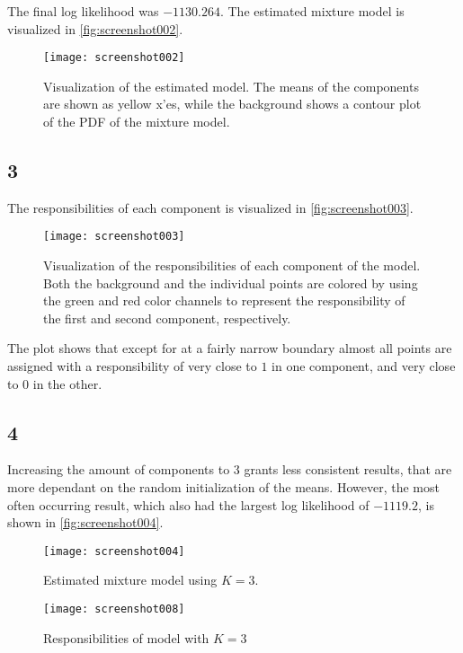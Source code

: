 \documentclass[a4paper, 12pt]{article}
\begin{document}
The final log likelihood was $-1130.264$. The estimated mixture model is visualized in \autoref{fig:screenshot002}.

\begin{figure}[H]
	\centering
	\texttt{[image: screenshot002]}
	\caption{Visualization of the estimated model. The means of the components are shown as yellow x'es, while the background shows a contour plot of the PDF of the mixture model.}
	\label{fig:screenshot002}
\end{figure}

\subsection{3}

The responsibilities of each component is visualized in \autoref{fig:screenshot003}.

\begin{figure}[H]
	\centering
	\texttt{[image: screenshot003]}
	\caption{Visualization of the responsibilities of each component of the model. Both the background and the individual points are colored by using the green and red color channels to represent the responsibility of the first and second component, respectively.}
	\label{fig:screenshot003}
\end{figure}

The plot shows that except for at a fairly narrow boundary almost all points are assigned with a responsibility of very close to $1$ in one component, and very close to $0$ in the other.

\subsection{4}

Increasing the amount of components to 3 grants less consistent results, that are more dependant on the random initialization of the means. However, the most often occurring result, which also had the largest log likelihood of $-1119.2$, is shown in \autoref{fig:screenshot004}.

\begin{figure}[H]
	\centering
	\texttt{[image: screenshot004]}
	\caption{Estimated mixture model using $K=3$.}
	\label{fig:screenshot004}
\end{figure}

\begin{figure}[H]
	\centering
	\texttt{[image: screenshot008]}
	\caption{Responsibilities of model with $K=3$}
	\label{fig:screenshot008}
\end{figure}
\end{document}
